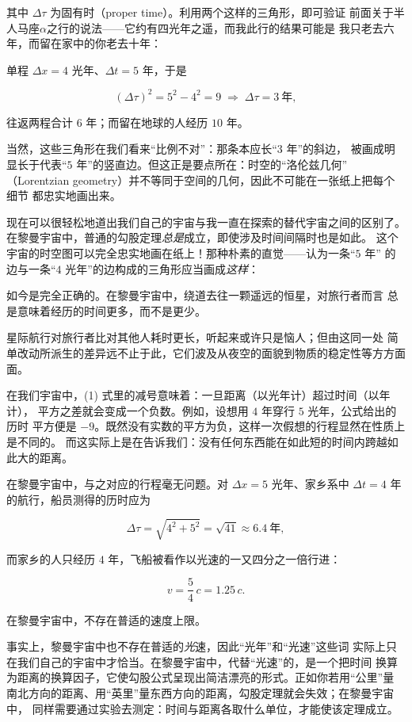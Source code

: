 其中 $\Delta\tau$ 为固有时（proper time）。利用两个这样的三角形，即可验证
前面关于半人马座$\alpha$之行的说法——它约有四光年之遥，而我此行的结果可能是
我只老去六年，而留在家中的你老去十年：


单程 $\Delta x = 4$ 光年、$\Delta t = 5$ 年，于是

\[
(\Delta \tau)^2 = 5^2 - 4^2 = 9 \;\Longrightarrow\; \Delta\tau = 3\ \text{年},
\]

往返两程合计 $6$ 年；而留在地球的人经历 $10$ 年。

当然，这些三角形在我们看来“比例不对”：那条本应长“$3$ 年”的斜边，
被画成明显长于代表“$5$ 年”的竖直边。但这正是要点所在：时空的“洛伦兹几何”
（Lorentzian geometry）并不等同于空间的几何，因此不可能在一张纸上把每个细节
都忠实地画出来。

现在可以很轻松地道出我们自己的宇宙与我一直在探索的替代宇宙之间的区别了。
在黎曼宇宙中，普通的勾股定理\emph{总是}成立，即使涉及时间间隔时也是如此。
这个宇宙的时空图可以完全忠实地画在纸上！那种朴素的直觉——认为一条“$5$ 年”
的边与一条“$4$ 光年”的边构成的三角形应当画成\emph{这样}：


如今是完全正确的。在黎曼宇宙中，绕道去往一颗遥远的恒星，对旅行者而言
总是意味着经历的时间更多，而不是更少。

星际航行对旅行者比对其他人耗时更长，听起来或许只是恼人；但由这同一处
简单改动所派生的差异远不止于此，它们波及从夜空的面貌到物质的稳定性等方方面面。

在我们宇宙中，(1) 式里的减号意味着：一旦距离（以光年计）超过时间（以年计），
平方之差就会变成一个负数。例如，设想用 $4$ 年穿行 $5$ 光年，公式给出的历时
平方便是 $-9$。既然没有实数的平方为负，这样一次假想的行程显然在性质上是不同的。
而这实际上是在告诉我们：没有任何东西能在如此短的时间内跨越如此大的距离。

在黎曼宇宙中，与之对应的行程毫无问题。对 $\Delta x = 5$ 光年、家乡系中
$\Delta t = 4$ 年的航行，船员测得的历时应为

\[
\Delta\tau = \sqrt{4^2 + 5^2} = \sqrt{41} \approx 6.4\ \text{年},
\]

而家乡的人只经历 $4$ 年，飞船被看作以光速的一又四分之一倍行进：

\[
v = \frac{5}{4}\,c = 1.25\,c .
\]

在黎曼宇宙中，不存在普适的速度上限。

事实上，黎曼宇宙中也不存在普适的\emph{光}速，因此“光年”和“光速”这些词
实际上只在我们自己的宇宙中才恰当。在黎曼宇宙中，代替“光速”的，是一个把时间
换算为距离的换算因子，它使勾股公式呈现出简洁漂亮的形式。正如你若用“公里”量
南北方向的距离、用“英里”量东西方向的距离，勾股定理就会失效；在黎曼宇宙中，
同样需要通过实验去测定：时间与距离各取什么单位，才能使该定理成立。

